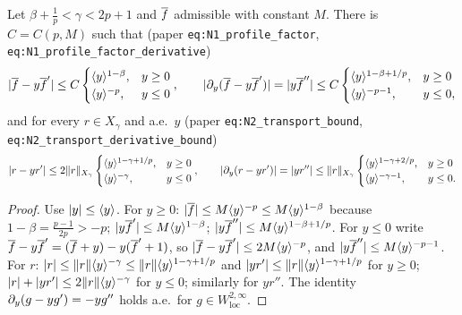 \begin{lemma}
  \label{lem:c10_transport_factors}
  Let $\beta+\frac1p<\gamma<2p+1$ and $\overline{f}$ admissible with constant $M$. There is $C=C(p,M)$ such that
  (paper \texttt{eq:N1\_profile\_factor}, \texttt{eq:N1\_profile\_factor\_derivative})
  \[
    |\overline{f}-y\overline{f}'|\le C\begin{cases}\langle y \rangle^{1-\beta},&y\ge0\\\langle y \rangle^{-p},&y\le0\end{cases},\qquad
    |\partial_y(\overline{f}-y\overline{f}')|=|y\overline{f}''|\le C\begin{cases}\langle y \rangle^{1-\beta+1/p},&y\ge0\\\langle y \rangle^{-p-1},&y\le0,\end{cases}
  \]
  and for every $r\in X_\gamma$ and a.e.\ $y$ (paper \texttt{eq:N2\_transport\_bound},
  \texttt{eq:N2\_transport\_derivative\_bound})
  \[
    |r-yr'|\le 2\|r\|_{X_\gamma}\begin{cases}\langle y \rangle^{1-\gamma+1/p},&y\ge0\\\langle y \rangle^{-\gamma},&y\le0\end{cases},\qquad
    |\partial_y(r-yr')|=|yr''|\le \|r\|_{X_\gamma}\begin{cases}\langle y \rangle^{1-\gamma+2/p},&y\ge0\\\langle y \rangle^{-\gamma-1},&y\le0.\end{cases}
  \]
\end{lemma}
\begin{proof}
  Use $|y|\le\langle y \rangle$. For $y\ge0$: $|\overline{f}|\le M\langle y \rangle^{-p}\le M\langle y \rangle^{1-\beta}$ because
  $1-\beta=\frac{p-1}{2p}>-p$; $|y\overline{f}'|\le M\langle y \rangle^{1-\beta}$; $|y\overline{f}''|\le M\langle y \rangle^{1-\beta+1/p}$.
  For $y\le0$ write $\overline{f}-y\overline{f}'=(\overline{f}+y)-y(\overline{f}'+1)$, so $|\overline{f}-y\overline{f}'|\le 2M\langle y \rangle^{-p}$, and
  $|y\overline{f}''|\le M\langle y \rangle^{-p-1}$. For $r$: $|r|\le\|r\|\langle y \rangle^{-\gamma}\le\|r\|\langle y \rangle^{1-\gamma+1/p}$ and
  $|yr'|\le\|r\|\langle y \rangle^{1-\gamma+1/p}$ for $y\ge0$; $|r|+|yr'|\le 2\|r\|\langle y \rangle^{-\gamma}$ for $y\le0$;
  similarly for $yr''$. The identity $\partial_y(g-yg')=-yg''$ holds a.e.\ for $g\in W^{2,\infty}_{\mathrm{loc}}$.
\end{proof}

